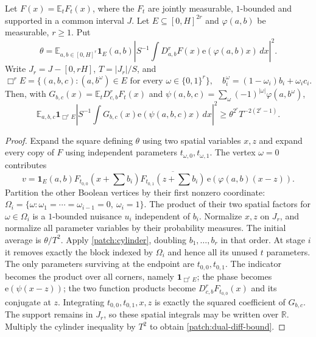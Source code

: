 \documentclass[11pt]{article}
\theoremstyle{definition}
\newcommand{\ee}[1]{\mathrm e\!\left(#1\right)}
\begin{document}
\begin{lemma}\label{patch:dual-difference}
Let $F(x)=\mathbb E_tF_t(x)$, where the $F_t$ are jointly measurable, $1$-bounded and supported
in a common interval $J$.  Let $E\subseteq[0,H]^{2r}$ and $\varphi(a,b)$ be measurable, $r\geq1$.
Put
\[
 \theta=\mathbb E_{a,b\in[0,H]^r}\mathbf1_E(a,b)
           \left|S^{-1}\int D_{a,b}^{r}F(x)\ee{\varphi(a,b)x}\,dx\right|^2.
\]
Write $J_r=J-[0,rH]$, $T=|J_r|/S$, and
\[
 \Box^r E=\{(a,b,c): (a,b^\omega)\in E\text{ for every }\omega\in\{0,1\}^r\},
 \quad b_i^\omega=(1-\omega_i)b_i+\omega_i c_i.
\]
Then, with $G_{b,c}(x)=\mathbb E_tD_{c,b}^{r}F_t(x)$ and
$\psi(a,b,c)=\sum_\omega(-1)^{|\omega|}\varphi(a,b^\omega)$,
\[
 \label{patch:dual-diff-bound}
 \mathbb E_{a,b,c}\mathbf1_{\Box^r E}
       \left|S^{-1}\int G_{b,c}(x)\ee{\psi(a,b,c)x}\,dx\right|^2
 \geq\theta^{2^r}T^{-2(2^r-1)}.
 \tag{\theequation}
\]
\end{lemma}
\begin{proof}
Expand the square defining $\theta$ using two spatial variables $x,z$ and expand every copy
of $F$ using independent parameters $t_{\omega,0},t_{\omega,1}$.
The vertex $\omega=0$ contributes
\[
 v=\mathbf1_E(a,b)F_{t_{0,0}}(x+\textstyle\sum b_i)
       \overline{F_{t_{0,1}}(z+\textstyle\sum b_i)}\,
       \ee{\varphi(a,b)(x-z)}.
\]
Partition the other Boolean vertices by their first nonzero coordinate:
$\Omega_i=\{\omega:\omega_1=\cdots=\omega_{i-1}=0,\ \omega_i=1\}$.
The product of their two spatial factors for $\omega\in\Omega_i$ is a $1$-bounded nuisance
$u_i$ independent of $b_i$.  Normalize $x,z$ on $J_r$, and normalize all parameter variables
by their probability measures.  The initial average is $\theta/T^2$.
Apply \cref{patch:cylinder}, doubling $b_1,\ldots,b_r$ in that order.
At stage $i$ it removes exactly the block indexed by $\Omega_i$ and hence all its unused
$t$ parameters.  The only parameters surviving at the endpoint are $t_{0,0},t_{0,1}$.
The indicator becomes the product over all corners, namely $\mathbf1_{\Box^r E}$;
the phase becomes $\ee{\psi(x-z)}$; the two function products become
$D_{c,b}^{r}F_{t_{0,0}}(x)$ and its conjugate at $z$.
Integrating $t_{0,0},t_{0,1},x,z$ is exactly the squared coefficient of $G_{b,c}$.
The support remains in $J_r$, so these spatial integrals may be written over $\mathbb R$.
Multiply the cylinder inequality by $T^2$ to obtain \eqref{patch:dual-diff-bound}.
\end{proof}
\end{document}
